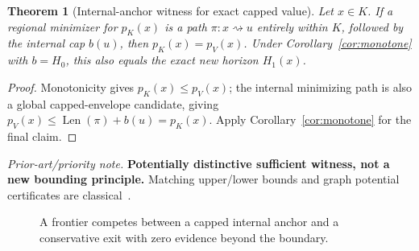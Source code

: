 \documentclass[11pt,letterpaper]{article}
\newtheorem{theorem}{Theorem}[section]
\theoremstyle{definition}
\theoremstyle{remark}
\newcommand{\Len}{\operatorname{Len}}
\newcommand{\novel}[1]{\par\begingroup\small\textit{Prior-art/priority note.} #1\par\endgroup}
\begin{document}
\begin{theorem}[Internal-anchor witness for exact capped value]\label{thm:anchor}
Let \(x\in K\). If a regional minimizer for \(p_K(x)\) is a path \(\pi:x\rightsquigarrow u\) entirely within \(K\), followed by the internal cap \(b(u)\), then \(p_K(x)=p_V(x)\). Under Corollary~\ref{cor:monotone} with \(b=H_0\), this also equals the exact new horizon \(H_1(x)\).
\end{theorem}
\begin{proof}
Monotonicity gives \(p_K(x)\le p_V(x)\); the internal minimizing path is also a global capped-envelope candidate, giving \(p_V(x)\le\Len(\pi)+b(u)=p_K(x)\). Apply Corollary~\ref{cor:monotone} for the final claim.
\end{proof}
\novel{\textbf{Potentially distinctive sufficient witness, not a new bounding principle.} Matching upper/lower bounds and graph potential certificates are classical~\cite{Hart1968,Mohri,Goldberg}.}

\begin{figure}[t]
\centering
{}
\caption{A frontier competes between a capped internal anchor and a conservative exit with zero evidence beyond the boundary.}
\label{fig:frontier}
\end{figure}
\end{document}
